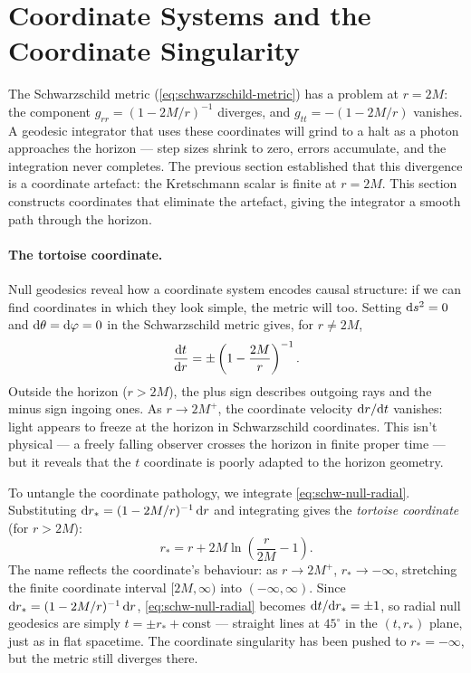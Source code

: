 \section{Coordinate Systems and the Coordinate Singularity}
\label{sec:schw-coordinates}

The Schwarzschild metric (\cref{eq:schwarzschild-metric}) has a
problem at $r = 2M$: the component $g_{rr} = (1 - 2M/r)^{-1}$
diverges, and $g_{tt} = -(1 - 2M/r)$ vanishes.  A geodesic integrator
that uses these coordinates will grind to a halt as a photon approaches
the horizon --- step sizes shrink to zero, errors accumulate, and the
integration never completes.  The previous section established that this
divergence is a coordinate artefact: the Kretschmann scalar is finite
at $r = 2M$.  This section constructs coordinates that eliminate the
artefact, giving the integrator a smooth path through the horizon.

\paragraph{The tortoise coordinate.}

Null geodesics reveal how a coordinate system encodes causal structure:
if we can find coordinates in which they look simple, the metric will
too.  Setting $\mathrm{d} s^2 = 0$ and $\mathrm{d}\theta = \mathrm{d}\varphi = 0$ in the
Schwarzschild metric gives, for $r \neq 2M$,
%
\begin{equation}
  \frac{\mathrm{d} t}{\mathrm{d} r} = \pm \left(1 - \frac{2M}{r}\right)^{-1} .
  \label{eq:schw-null-radial}
\end{equation}
%
Outside the horizon ($r > 2M$), the plus sign describes outgoing rays
and the minus sign ingoing ones.  As $r \to 2M^+$, the coordinate
velocity $\mathrm{d} r/\mathrm{d} t$ vanishes: light appears to freeze at the horizon
in Schwarzschild coordinates.  This isn't physical --- a freely falling
observer crosses the horizon in finite proper time --- but it reveals
that the $t$ coordinate is poorly adapted to the horizon geometry.

To untangle the coordinate pathology, we integrate
\cref{eq:schw-null-radial}.  Substituting $\mathrm{d} r_* = (1 - 2M/r)^{-1}\,
\mathrm{d} r$ and integrating gives the \emph{tortoise coordinate}
(for $r > 2M$):
%
\begin{equation}
  r_* = r + 2M \ln\!\left(\frac{r}{2M} - 1\right) .
  \label{eq:tortoise}
\end{equation}
%
The name reflects the coordinate's behaviour: as $r \to 2M^+$,
$r_* \to -\infty$, stretching the finite coordinate interval
$[2M, \infty)$ into $(-\infty, \infty)$.  Since $\mathrm{d} r_* = (1 -
2M/r)^{-1}\,\mathrm{d} r$, \cref{eq:schw-null-radial} becomes $\mathrm{d} t/\mathrm{d} r_*
= \pm 1$, so radial null geodesics are simply $t = \pm r_* +
\text{const}$ --- straight lines at $45^\circ$ in the $(t, r_*)$
plane, just as in flat spacetime.  The coordinate singularity has been
pushed to $r_* = -\infty$, but the metric still diverges there.

